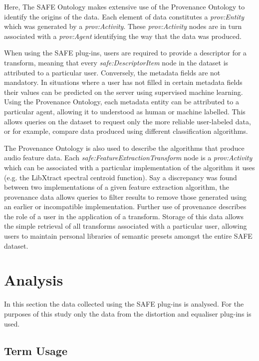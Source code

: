 		Here, The SAFE Ontology makes extensive use of the Provenance Ontology to identify the origins of the data.
		Each element of data constitutes a \emph{prov:Entity} which was generated by a \emph{prov:Activity}. These
		\emph{prov:Activity} nodes are in turn associated with a \emph{prov:Agent} identifying the way that the data
		was produced.

		When using the SAFE plug-ins, users are required to provide a descriptor for a transform, meaning that every
		\emph{safe:DescriptorItem} node in the dataset is attributed to a particular user. Conversely, the metadata
		fields are not mandatory. In situations where a user has not filled in certain metadata fields their values
		can be predicted on the server using supervised machine learning. Using the Provenance Ontology, each
		metadata entity can be attributed to a particular agent, allowing it to understood as human or machine
		labelled. This allows queries on the dataset to request only the more reliable user-labeled data, or for
		example, compare data produced using different classification algorithms.

		The Provenance Ontology is also used to describe the algorithms that produce audio feature data. Each
		\emph{safe:FeatureExtractionTransform} node is a \emph{prov:Activity} which can be associated with a
		particular implementation of the algorithm it uses (e.g. the LibXtract \citep{bullock2007libxtract} spectral
		centroid function). Say a discrepancy was found between two implementations of a given feature extraction
		algorithm, the provenance data allows queries to filter results to remove those generated using an earlier
		or incompatible implementation. Further use of provenance describes the role of a user in the application of
		a transform. Storage of this data allows the simple retrieval of all transforms associated with a particular
		user, allowing users to maintain personal libraries of semantic presets amongst the entire SAFE dataset.

\section{Analysis}
\label{sec:TimbreEvaluation-Analysis}
	In this section the data collected using the SAFE plug-ins is analysed. For the purposes of this study only the data
	from the distortion and equaliser plug-ins is used.

	\subsection{Term Usage}
	\label{sec:TimbreEvaluation-Analysis-TermUsage}

